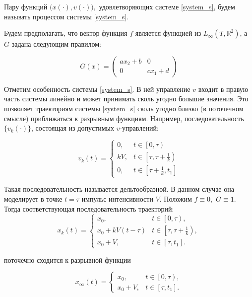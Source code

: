 \documentclass[a4paper,12pt]{article}
\begin{document}
Пару функций $\bigl(x(\cdot),v(\cdot)\bigr),$ удовлетворяющих
системе \eqref{system_s}, будем называть процессом системы \eqref{system_s}.

Будем предполагать, что вектор-функция $f$ является функцией из
$L_{\infty}(T,\mathbb{R}^2)$, а $G$ задана следующим правилом:

\begin{equation*}
    G(x) = 
    \begin{pmatrix}
        a x_2+b & 0\\ 0 & c x_1 +d 
    \end{pmatrix}
\end{equation*}


Отметим особенность системы \eqref{system_s}. В ней управление $v$ входит в
правую часть системы линейно и может принимать сколь угодно большие
значения. Это позволяет траекториям системы \eqref{system_s} сколь угодно близко
(в поточечном смысле) приближаться к разрывным функциям.  Например,
последовательность $\{v_k(\cdot)\}$, состоящая из допустимых
$v$-управлений:

\begin{equation*} 
    v_k(t)=\left\{ 
    \begin{array}{ll}
        0, & t \in \left[0,\tau\right)\\
        kV,  & t\in \left[\tau,\tau+\frac{1}{k}\right)\\
        0,  & t\in \left[\tau+\frac{1}{k},t_1\right]
    \end{array}
    \right.
\end{equation*}

Такая последовательность
называется дельтообразной. В данном случае она моделирует в точке
$t=\tau$ импульс интенсивности $V$.  Положим $f\equiv 0,$
$G\equiv 1$. Тогда соответствующая последовательность траекторий:
\begin{equation*}
    x_{k}(t)=\left\{
        \begin{array}{ll}
            x_0, & t \in \left[0,\tau \right), \\
            x_0+kV(t-\tau) & t \in \left[\tau,\tau+\frac{1}{k} \right),\\
            x_0+V, & t\in [\tau,t_1].
        \end{array} \right.
\end{equation*}

поточечно сходится к разрывной функции

\begin{equation*}
    x_{\infty}(t)=\left\{
        \begin{array}{ll}
            x_0, & t \in \left[0,\tau \right), \\
            x_0+V, & t\in [\tau,t_1].
        \end{array} \right.
\end{equation*}
\end{document}
